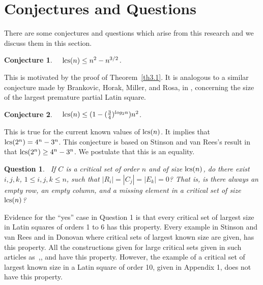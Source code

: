 \documentclass[12pt]{article}
\newtheorem{conjecture}{Conjecture}
\newtheorem{question}{Question}
\def\lcs#1{{\rm lcs}(#1)}
\begin{document}
\section{Conjectures and Questions}

There are some conjectures and questions which arise from this research and we
discuss them in this section.

\begin{conjecture}      \ \
$\lcs{n} \leq n^2 - n^{3/2}$.
\end{conjecture}
%
This is motivated by the proof of Theorem~\ref{th3.1}.
It is analogous to a similar conjecture
made by Brankovic, Horak, Miller, and Rosa, in {\bf\cite{bhmr}}, concerning
the size of the largest premature partial Latin square.
%
\begin{conjecture} \ \
$\lcs{n} \leq (1 - (\frac{3}{4})^{log_2{n}}) n^{2}$.
\end{conjecture}
%
This is true for the current known values of $\lcs{n}$. 
It implies that $\lcs{2^{n}} = 4^{n} - 3^{n}$.
This conjecture is based on Stinson and van Rees's result in
{\bf\cite{Sti1}} that $\lcs{2^{n}} \geq 4^{n} - 3^{n}$. We 
postulate that this is an equality.  

%
\begin{question} \
If $C$ is a critical set of order $n$ and of size $\lcs{n}$,
do there exist $i,j,k$, $1 \leq i,j,k \leq n$, such that
$|R_{i}| = |C_{j}| = |E_{k}| = 0$?  That is, is there
always an empty row, an empty column, and a missing element in a critical
set of size $\lcs{n}$?
\end{question}
Evidence for the ``yes'' case in Question 1 is that
every critical set of largest size in Latin
squares of orders 1 to 6 has this property.  Every example in Stinson
and van Rees {\bf\cite{Sti1}} and in Donovan {\bf\cite{Don1}}
where critical sets of largest known size are given, has this property.
All the constructions given for large critical sets given in such articles
as~{\bf\cite{MR99a:05018}},{\bf\cite{ffl}},{\bf\cite{Nel2}} and {\bf\cite{Sti1}}
have this property.
However, the example of a critical set of largest known size in a Latin square
of order 10, given in Appendix 1, does not have this property.
\end{document}
